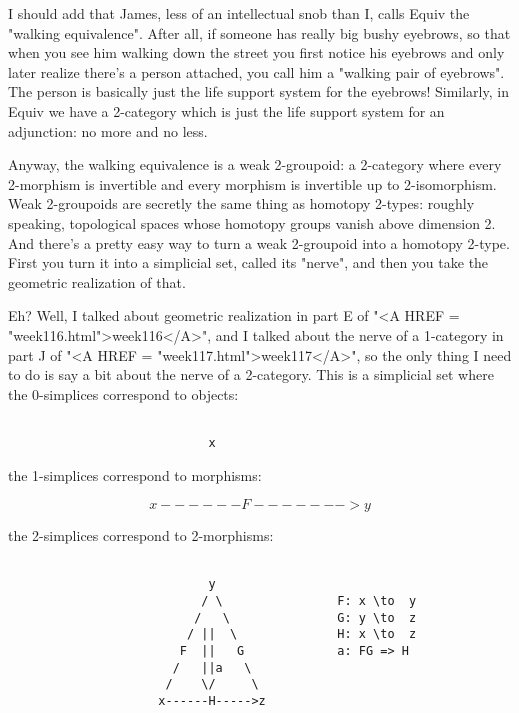 I should add that James, less of an intellectual snob than I, calls
Equiv the "walking equivalence".  After all, if someone has
really big bushy eyebrows, so that when you see him walking down the
street you first notice his eyebrows and only later realize there's a
person attached, you call him a "walking pair of eyebrows".
The person is basically just the life support system for the eyebrows!
Similarly, in Equiv we have a 2-category which is just the life support
system for an adjunction: no more and no less.

Anyway, the walking equivalence is a weak 2-groupoid: a 2-category where
every 2-morphism is invertible and every morphism is invertible up to
2-isomorphism.  Weak 2-groupoids are secretly the same thing as homotopy
2-types: roughly speaking, topological spaces whose homotopy groups
vanish above dimension 2.  And there's a pretty easy way to turn a weak
2-groupoid into a homotopy 2-type.  First you turn it into a simplicial
set, called its "nerve", and then you take the geometric
realization of that.

Eh?  Well, I talked about geometric realization in part E of "<A
HREF = "week116.html">week116</A>", and I talked about the nerve of
a 1-category in part J of "<A HREF =
"week117.html">week117</A>", so the only thing I need to do is say
a bit about the nerve of a 2-category.  This is a simplicial set where
the 0-simplices correspond to objects:



\begin{verbatim}

                            x
\end{verbatim}
    
the 1-simplices correspond to morphisms:



$$

                    x ------F-------> y
$$
    
the 2-simplices correspond to 2-morphisms:


\begin{verbatim}

                            y
                           / \                F: x \to  y 
                          /   \               G: y \to  z
                         / ||  \              H: x \to  z
                        F  ||   G             a: FG => H
                       /   ||a   \
                      /    \/     \
                     x------H----->z
\end{verbatim}
    
